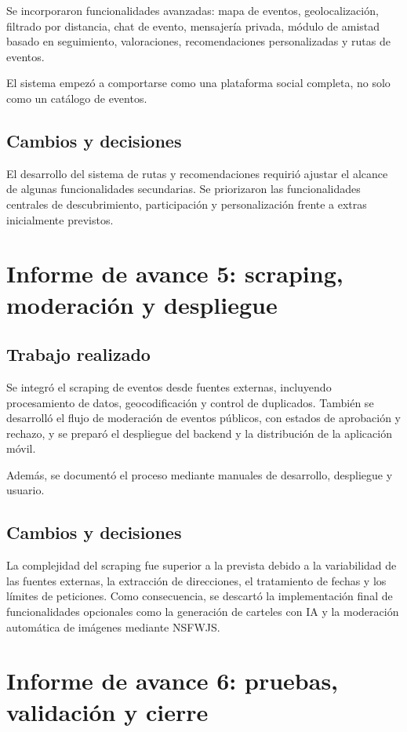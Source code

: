 Se incorporaron funcionalidades avanzadas: mapa de eventos, geolocalización, filtrado por distancia, chat de evento, mensajería privada, módulo de amistad basado en seguimiento, valoraciones, recomendaciones personalizadas y rutas de eventos.

El sistema empezó a comportarse como una plataforma social completa, no solo como un catálogo de eventos.

\subsection{Cambios y decisiones}

El desarrollo del sistema de rutas y recomendaciones requirió ajustar el alcance de algunas funcionalidades secundarias. Se priorizaron las funcionalidades centrales de descubrimiento, participación y personalización frente a extras inicialmente previstos.

\section{Informe de avance 5: scraping, moderación y despliegue}

\subsection{Trabajo realizado}

Se integró el scraping de eventos desde fuentes externas, incluyendo procesamiento de datos, geocodificación y control de duplicados. También se desarrolló el flujo de moderación de eventos públicos, con estados de aprobación y rechazo, y se preparó el despliegue del backend y la distribución de la aplicación móvil.

Además, se documentó el proceso mediante manuales de desarrollo, despliegue y usuario.

\subsection{Cambios y decisiones}

La complejidad del scraping fue superior a la prevista debido a la variabilidad de las fuentes externas, la extracción de direcciones, el tratamiento de fechas y los límites de peticiones. Como consecuencia, se descartó la implementación final de funcionalidades opcionales como la generación de carteles con IA y la moderación automática de imágenes mediante NSFWJS.

\section{Informe de avance 6: pruebas, validación y cierre}

